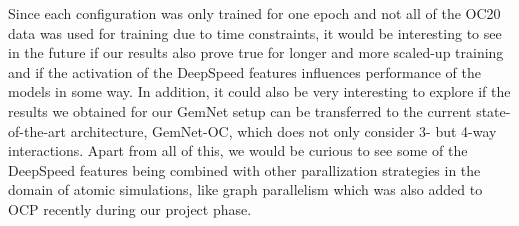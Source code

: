 Since each configuration was only trained for one epoch and not all of the OC20 data was 
used for training due to time constraints, it would be interesting to see in the future if our results 
also prove true for longer and more scaled-up training and if the activation of the DeepSpeed features 
influences performance of the models in some way. 
In addition, it could also be very interesting to explore if the results we obtained for our GemNet setup
can be transferred to the current state-of-the-art architecture, GemNet-OC, which does not only
consider 3- but 4-way interactions.
Apart from all of this, we would be curious to see some of the DeepSpeed features being
combined with other parallization strategies in the domain of atomic simulations, like 
graph parallelism \cite{https://doi.org/10.48550/arxiv.2203.09697} which was also added to
OCP recently during our project phase.

